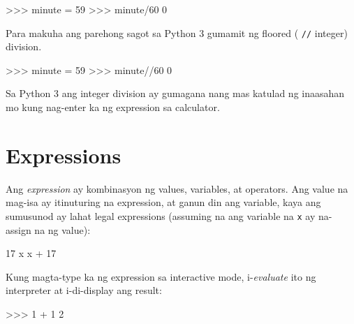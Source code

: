 \documentclass[10pt,]{book}
\newenvironment{Shaded}{}{}
\newcommand{\DecValTok}[1]{\textcolor[rgb]{0.25,0.63,0.44}{#1}}
\newcommand{\NormalTok}[1]{#1}
\newcommand{\OperatorTok}[1]{\textcolor[rgb]{0.40,0.40,0.40}{#1}}
\begin{document}
\begin{Shaded}
\begin{Highlighting}[]
\OperatorTok{\textgreater{}\textgreater{}\textgreater{}}\NormalTok{ minute }\OperatorTok{=} \DecValTok{59}
\OperatorTok{\textgreater{}\textgreater{}\textgreater{}}\NormalTok{ minute}\OperatorTok{/}\DecValTok{60}
\DecValTok{0}
\end{Highlighting}
\end{Shaded}

Para makuha ang parehong sagot sa Python 3 gumamit ng floored (
\texttt{//} integer) division.

\begin{Shaded}
\begin{Highlighting}[]
\OperatorTok{\textgreater{}\textgreater{}\textgreater{}}\NormalTok{ minute }\OperatorTok{=} \DecValTok{59}
\OperatorTok{\textgreater{}\textgreater{}\textgreater{}}\NormalTok{ minute}\OperatorTok{//}\DecValTok{60}
\DecValTok{0}
\end{Highlighting}
\end{Shaded}

Sa Python 3 ang integer division ay gumagana nang mas katulad ng
inaasahan mo kung nag-enter ka ng expression sa calculator.

  

\section{Expressions}\label{expressions}

Ang \emph{expression} ay kombinasyon ng values, variables, at operators.
Ang value na mag-isa ay itinuturing na expression, at ganun din ang
variable, kaya ang sumusunod ay lahat legal expressions (assuming na ang
variable na \texttt{x} ay na-assign na ng value):

 

\begin{Shaded}
\begin{Highlighting}[]
\DecValTok{17}
\NormalTok{x}
\NormalTok{x }\OperatorTok{+} \DecValTok{17}
\end{Highlighting}
\end{Shaded}

Kung magta-type ka ng expression sa interactive mode, i-\emph{evaluate}
ito ng interpreter at i-di-display ang result:

\begin{Shaded}
\begin{Highlighting}[]
\OperatorTok{\textgreater{}\textgreater{}\textgreater{}} \DecValTok{1} \OperatorTok{+} \DecValTok{1}
\DecValTok{2}
\end{Highlighting}
\end{Shaded}
\end{document}
